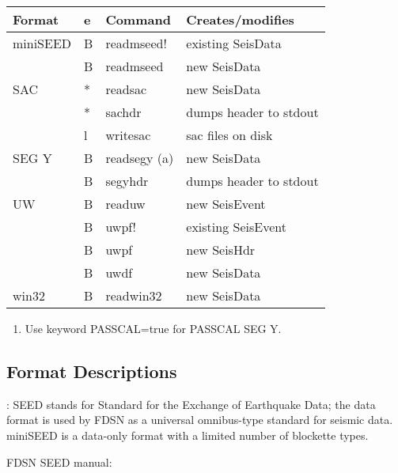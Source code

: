 \documentclass[letterpaper,11pt,english]{sphinxmanual}
\begin{document}
\begin{savenotes}\sphinxattablestart
\centering
\begin{tabulary}{\linewidth}[t]{|T|T|T|T|}
\hline
\sphinxstyletheadfamily 
Format
&\sphinxstyletheadfamily 
e
&\sphinxstyletheadfamily 
Command
&\sphinxstyletheadfamily 
Creates/modifies
\\
\hline
miniSEED
&
B
&
readmseed!
&
existing SeisData
\\
\hline&
B
&
readmseed
&
new SeisData
\\
\hline
SAC
&
*
&
readsac
&
new SeisData
\\
\hline&
*
&
sachdr
&
dumps header to stdout
\\
\hline&
l
&
writesac
&
sac files on disk
\\
\hline
SEG Y
&
B
&
readsegy (a)
&
new SeisData
\\
\hline&
B
&
segyhdr
&
dumps header to stdout
\\
\hline
UW
&
B
&
readuw
&
new SeisEvent
\\
\hline&
B
&
uwpf!
&
existing SeisEvent
\\
\hline&
B
&
uwpf
&
new SeisHdr
\\
\hline&
B
&
uwdf
&
new SeisData
\\
\hline
win32
&
B
&
readwin32
&
new SeisData
\\
\hline
\end{tabulary}
\par
\sphinxattableend\end{savenotes}
\begin{enumerate}
\def\theenumi{\alph{enumi}}
\def\labelenumi{(\theenumi )}
\makeatletter\def\p@enumii{\p@enumi (\theenumi )}\makeatother
\item {} 
Use keyword PASSCAL=true for PASSCAL SEG Y.

\end{enumerate}


\subsection{Format Descriptions}
\label{\detokenize{src/Formats/fileformats:format-descriptions}}
: SEED stands for Standard for the Exchange of Earthquake Data; the data format is used by FDSN as a universal omnibus-type standard for seismic data. miniSEED is a data-only format with a limited number of blockette types. %
\begin{footnote}[1]\sphinxAtStartFootnote
FDSN SEED manual: 
%
\end{footnote}
\end{document}
